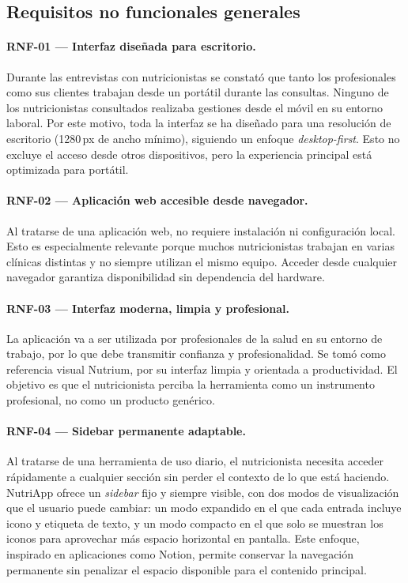\subsection{Requisitos no funcionales generales}

\paragraph{RNF-01 --- Interfaz diseñada para escritorio.}
Durante las entrevistas con nutricionistas se constató que tanto los profesionales como sus clientes trabajan desde un portátil durante las consultas. Ninguno de los nutricionistas consultados realizaba gestiones desde el móvil en su entorno laboral. Por este motivo, toda la interfaz se ha diseñado para una resolución de escritorio (1280\,px de ancho mínimo), siguiendo un enfoque \textit{desktop-first}. Esto no excluye el acceso desde otros dispositivos, pero la experiencia principal está optimizada para portátil.

\paragraph{RNF-02 --- Aplicación web accesible desde navegador.}
Al tratarse de una aplicación web, no requiere instalación ni configuración local. Esto es especialmente relevante porque muchos nutricionistas trabajan en varias clínicas distintas y no siempre utilizan el mismo equipo. Acceder desde cualquier navegador garantiza disponibilidad sin dependencia del hardware.

\paragraph{RNF-03 --- Interfaz moderna, limpia y profesional.}
La aplicación va a ser utilizada por profesionales de la salud en su entorno de trabajo, por lo que debe transmitir confianza y profesionalidad. Se tomó como referencia visual Nutrium, por su interfaz limpia y orientada a productividad. El objetivo es que el nutricionista perciba la herramienta como un instrumento profesional, no como un producto genérico.

\paragraph{RNF-04 --- Sidebar permanente adaptable.}
Al tratarse de una herramienta de uso diario, el nutricionista necesita acceder rápidamente a cualquier sección sin perder el contexto de lo que está haciendo. NutriApp ofrece un \textit{sidebar} fijo y siempre visible, con dos modos de visualización que el usuario puede cambiar: un modo expandido en el que cada entrada incluye icono y etiqueta de texto, y un modo compacto en el que solo se muestran los iconos para aprovechar más espacio horizontal en pantalla. Este enfoque, inspirado en aplicaciones como Notion, permite conservar la navegación permanente sin penalizar el espacio disponible para el contenido principal.

